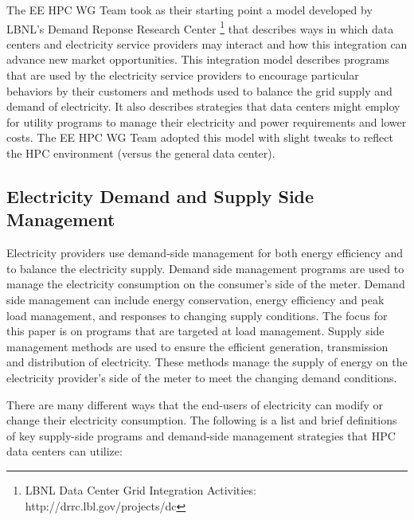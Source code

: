 The EE HPC WG Team took as their starting point a model developed by LBNL's 
Demand Reponse Research Center \footnote{LBNL
Data Center Grid Integration Activities: http://drrc.lbl.gov/projects/dc} that
describes ways in which data centers and electricity service providers may
interact and how this integration can advance new market opportunities. This
integration model describes programs that are used by the electricity service
providers to encourage particular behaviors by their customers and methods used
to balance the grid supply and demand of electricity. It also describes
strategies that data centers might employ for utility programs to manage their
electricity and power requirements and lower costs. The EE HPC WG Team adopted
this model with slight tweaks to reflect the HPC environment (versus the
general data center).


\subsection{Electricity Demand and Supply Side Management}

Electricity providers use demand-side management for both energy efficiency and to balance the electricity supply. 
Demand side management programs are used to manage the electricity consumption on the consumer’s side of the meter.  
Demand side management can include energy conservation, energy efficiency and peak load management, and responses to 
changing supply conditions.  The focus for this paper is on programs that are targeted at load management. 
Supply side management methods are used to ensure the efficient generation, transmission and distribution of 
electricity.  These methods 
manage the supply of energy on the electricity provider’s side of the meter to meet the changing demand conditions. 

There are many different ways that the end-users of electricity can modify or change their electricity consumption. 
The following is a list and 
brief definitions of key supply-side programs and demand-side management strategies that HPC data centers can utilize:



